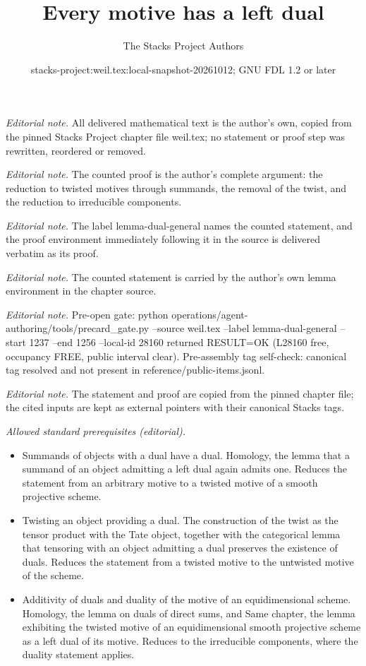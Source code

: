 \documentclass[10pt,a4paper]{amsart}
\title{Every motive has a left dual}
\author{The Stacks Project Authors}
\date{stacks-project:weil.tex:local-snapshot-20261012; GNU FDL 1.2 or later}
\theoremstyle{plain}
\theoremstyle{definition}
\theoremstyle{remark}
\numberwithin{equation}{subsection}
\begin{document}
\maketitle
\noindent\textit{Editorial note.} All delivered mathematical text is the author's own, copied from the pinned Stacks Project chapter file weil.tex; no statement or proof step was rewritten, reordered or removed.\par\medskip
\noindent\textit{Editorial note.} The counted proof is the author's complete argument: the reduction to twisted motives through summands, the removal of the twist, and the reduction to irreducible components.\par\medskip
\noindent\textit{Editorial note.} The label lemma-dual-general names the counted statement, and the proof environment immediately following it in the source is delivered verbatim as its proof.\par\medskip
\noindent\textit{Editorial note.} The counted statement is carried by the author's own lemma environment in the chapter source.\par\medskip
\noindent\textit{Editorial note.} Pre-open gate: python operations/agent-authoring/tools/precard\_gate.py --source weil.tex --label lemma-dual-general --start 1237 --end 1256 --local-id 28160 returned RESULT=OK (L28160 free, occupancy FREE, public interval clear). Pre-assembly tag self-check: canonical tag resolved and not present in reference/public-items.jsonl.\par\medskip
\noindent\textit{Editorial note.} The statement and proof are copied from the pinned chapter file; the cited inputs are kept as external pointers with their canonical Stacks tags.\par\medskip
\noindent\textit{Allowed standard prerequisites (editorial).}\begin{itemize}
\item Summands of objects with a dual have a dual. Homology, the lemma that a summand of an object admitting a left dual again admits one. Reduces the statement from an arbitrary motive to a twisted motive of a smooth projective scheme.
\item Twisting an object providing a dual. The construction of the twist as the tensor product with the Tate object, together with the categorical lemma that tensoring with an object admitting a dual preserves the existence of duals. Reduces the statement from a twisted motive to the untwisted motive of the scheme.
\item Additivity of duals and duality of the motive of an equidimensional scheme. Homology, the lemma on duals of direct sums, and Same chapter, the lemma exhibiting the twisted motive of an equidimensional smooth projective scheme as a left dual of its motive. Reduces to the irreducible components, where the duality statement applies.
\end{itemize}\medskip
\end{document}
